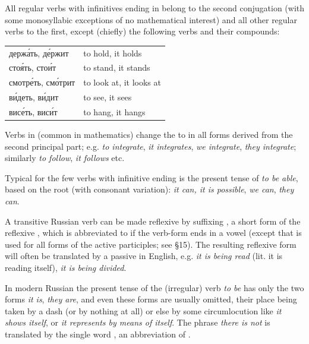 All regular verbs with infinitives ending in  belong to the second conjugation (with some monosyllabic exceptions of no mathematical interest) and all other regular verbs to the first, except (chiefly) the following verbs and their compounds:
\begin{center}\small
\begin{tabular}{@{}>{\cyrillicfont}ll@{}}
держа́ть, де́ржит & to hold, it holds\\
стоя́ть, стои́т & to stand, it stands\\
смотре́ть, смо́трит & to look at, it looks at\\
ви́деть, ви́дит & to see, it sees\\
висе́ть, виси́т & to hang, it hangs
\end{tabular}\end{center}

Verbs in  (common in mathematics) change the  to  in all forms derived from the second principal part; e.g.  \emph{to integrate},  \emph{it integrates},  \emph{we integrate},  \emph{they integrate}; similarly  \emph{to follow},  \emph{it follows} etc.

Typical for the few verbs with infinitive ending  is the present tense of  \emph{to be able}, based on the root  (with consonant variation):  \emph{it can, it is possible},  \emph{we can},  \emph{they can}.

A transitive Russian verb can be made reflexive by suffixing , a short form of the reflexive , which is abbreviated to  if the verb-form ends in a vowel (except that  is used for all forms of the active participles; see §15). The resulting reflexive form will often be translated by a passive in English, e.g.  \emph{it is being read} (lit. it is reading itself),  \emph{it is being divided}.

In modern Russian the present tense of the (irregular) verb  \emph{to be} has only the two forms  \emph{it is},  \emph{they are}, and even these forms are usually omitted, their place being taken by a dash (or by nothing at all) or else by some circumlocution like  \emph{it shows itself}, or  \emph{it represents by means of itself}. The phrase \emph{there is not} is translated by the single word , an abbreviation of .


